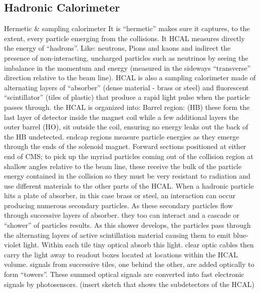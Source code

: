 \subsection{Hadronic Calorimeter}
Hermetic & sampling calorimeter 
It is “hermetic” makes sure it captures, to the extent, every particle emerging from the collisions. It HCAL measures directly the energy of “hadrons”. Like: neutrons, Pions and kaons and indirect the presence of non-interacting, uncharged particles such as neutrinos by seeing the imbalance in the momentum and energy (measured in the sideways “transverse” direction relative to the beam line). 
HCAL is also a sampling calorimeter made of alternating layers of “absorber” (dense material - brass or steel) and fluorescent “scintillator” (tiles of plastic) that produce a rapid light pulse when the particle passes through.
the HCAL is organized into: Barrel region: (HB) these form the last layer of detector inside the magnet coil while a few additional layers the outer barrel (HO), sit outside the coil, ensuring no energy leaks out the back of the HB undetected. endcap regions measure particle energies as they emerge through the ends of the solenoid magnet. Forward sections positioned at either end of CMS; to pick up the myriad particles coming out of the collision region at shallow angles relative to the beam line, these receive the bulk of the particle energy contained in the collision so they must be very resistant to radiation and use different materials to the other parts of the HCAL.
When a hadronic particle hits a plate of absorber, in this case brass or steel, an interaction can occur producing numerous secondary particles. As these secondary particles flow through successive layers of absorber. they too can interact and a cascade or “shower” of particles results. 
As this shower develops, the particles pass through the alternating layers of active scintillation material causing them to emit blue-violet light. Within each tile tiny optical absorb this light. clear optic cables then carry the light away to readout boxes located at locations within the HCAL volume. signals from successive tiles, one behind the other, are added optically to form “towers”. These summed optical signals are converted into fast electronic signals by photosensors.  
(insert sketch that shows the subdetectors of the HCAL)  


